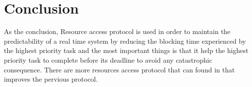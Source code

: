 \section{Conclusion}

As the conclusion, Resource access protocol is used in order to maintain the predictability of a real time system by reducing the blocking time experienced by the highest priority task and the most important things is that it help the highest priority task to complete before its deadline to avoid any catastrophic consequence. There are more resources access protocol that can found in \cite{b5} that improves the pervious protocol. 